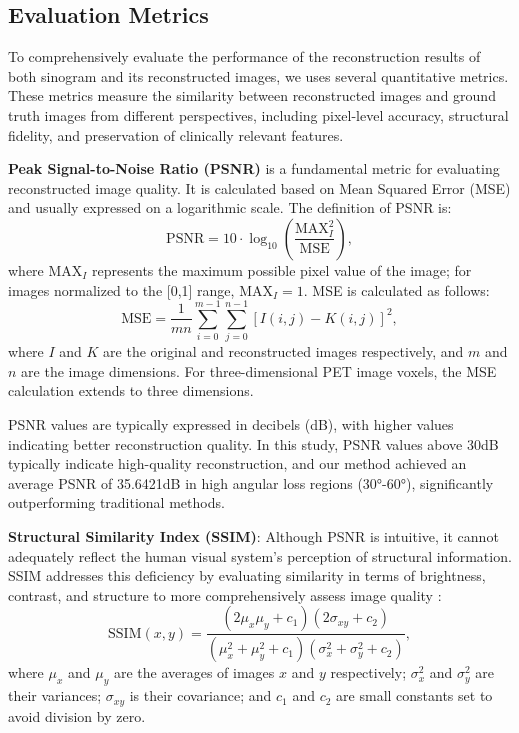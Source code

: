 \documentclass[12pt]{iopart}
\begin{document}
\subsection{Evaluation Metrics}

To comprehensively evaluate the performance of the reconstruction results of both sinogram and its reconstructed images, we uses several quantitative metrics. These metrics measure the similarity between reconstructed images and ground truth images from different perspectives, including pixel-level accuracy, structural fidelity, and preservation of clinically relevant features.


\textbf{Peak Signal-to-Noise Ratio (PSNR)} \cite{Hore2010PSNRvsSSIM} is a fundamental metric for evaluating reconstructed image quality. It is calculated based on Mean Squared Error (MSE) and usually expressed on a logarithmic scale. The definition of PSNR is:
\begin{equation}
\text{PSNR} = 10 \cdot \log_{10}\left(\frac{\text{MAX}_I^2}{\text{MSE}}\right),
\end{equation}
where $\text{MAX}_I$ represents the maximum possible pixel value of the image; for images normalized to the [0,1] range, $\text{MAX}_I = 1$. MSE is calculated as follows:
\begin{equation}
\text{MSE} = \frac{1}{mn}\sum_{i=0}^{m-1}\sum_{j=0}^{n-1}[I(i,j) - K(i,j)]^2,
\end{equation}
where $I$ and $K$ are the original and reconstructed images respectively, and $m$ and $n$ are the image dimensions. For three-dimensional PET image voxels, the MSE calculation extends to three dimensions.

PSNR values are typically expressed in decibels (dB), with higher values indicating better reconstruction quality. In this study, PSNR values above 30dB typically indicate high-quality reconstruction, and our method achieved an average PSNR of 35.6421dB in high angular loss regions (30°-60°), significantly outperforming traditional methods.

\textbf{Structural Similarity Index (SSIM)}: Although PSNR is intuitive, it cannot adequately reflect the human visual system's perception of structural information. SSIM addresses this deficiency by evaluating similarity in terms of brightness, contrast, and structure to more comprehensively assess image quality \cite{Wang2004SSIM}:
\begin{equation}
\text{SSIM}(x, y) = \frac{(2\mu_x\mu_y + c_1)(2\sigma_{xy} + c_2)}{(\mu_x^2 + \mu_y^2 + c_1)(\sigma_x^2 + \sigma_y^2 + c_2)},
\end{equation}
where $\mu_x$ and $\mu_y$ are the averages of images $x$ and $y$ respectively; $\sigma_x^2$ and $\sigma_y^2$ are their variances; $\sigma_{xy}$ is their covariance; and $c_1$ and $c_2$ are small constants set to avoid division by zero.
\end{document}
